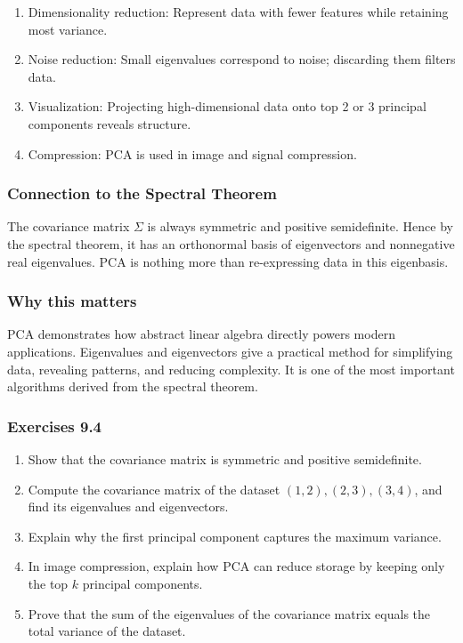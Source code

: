 \documentclass[
  12pt,
  a4paper,
]{article}
\begin{document}
\begin{enumerate}
\def\labelenumi{\arabic{enumi}.}
\item
  Dimensionality reduction: Represent data with fewer features while
  retaining most variance.
\item
  Noise reduction: Small eigenvalues correspond to noise; discarding
  them filters data.
\item
  Visualization: Projecting high-dimensional data onto top 2 or 3
  principal components reveals structure.
\item
  Compression: PCA is used in image and signal compression.
\end{enumerate}

\subsubsection{Connection to the Spectral
Theorem}\label{connection-to-the-spectral-theorem}

The covariance matrix \(\Sigma\) is always symmetric and positive
semidefinite. Hence by the spectral theorem, it has an orthonormal basis
of eigenvectors and nonnegative real eigenvalues. PCA is nothing more
than re-expressing data in this eigenbasis.

\subsubsection{Why this matters}\label{why-this-matters-35}

PCA demonstrates how abstract linear algebra directly powers modern
applications. Eigenvalues and eigenvectors give a practical method for
simplifying data, revealing patterns, and reducing complexity. It is one
of the most important algorithms derived from the spectral theorem.

\subsubsection{Exercises 9.4}\label{exercises-94}

\begin{enumerate}
\def\labelenumi{\arabic{enumi}.}
\item
  Show that the covariance matrix is symmetric and positive
  semidefinite.
\item
  Compute the covariance matrix of the dataset \((1,2), (2,3), (3,4)\),
  and find its eigenvalues and eigenvectors.
\item
  Explain why the first principal component captures the maximum
  variance.
\item
  In image compression, explain how PCA can reduce storage by keeping
  only the top \(k\) principal components.
\item
  Prove that the sum of the eigenvalues of the covariance matrix equals
  the total variance of the dataset.
\end{enumerate}
\end{document}
